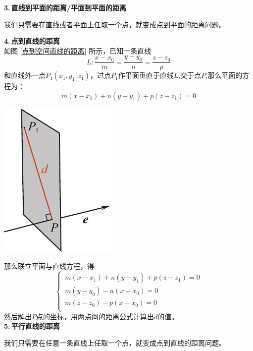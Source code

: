 \noindent \textbf{3.$\,$直线到平面的距离/平面到平面的距离}

我们只需要在直线或者平面上任取一个点，就变成点到平面的距离问题。
\vspace*{1em}

\noindent
\begin{minipage}{0.65\linewidth}
	\noindent \textbf{4.$\,$点到直线的距离}
 \\ \hspace*{2em}如图 \ref{点到空间直线的距离} 所示，已知一条直线
\begin{equation}
	L:\frac{x-x_0}{m}=\frac{y-y_0}{n}=\frac{z-z_0}{p}
\end{equation}
和直线外一点$P_1(x_1,y_1,z_1)$，过点$P_1$作平面垂直于直线$L$,交于点$P$,那么平面的方程为：
\begin{equation}
	m(x-x_1)+n(y-y_1)+p(z-z_1)=0
\end{equation}
\end{minipage}
\begin{minipage}{0.35\linewidth}
	\centering
	\includegraphics[width = 0.55\linewidth]{pic/C-5/linepd}
	\vspace*{-1em}
	\label{点到空间直线的距离}
\end{minipage}

\vspace*{0.5em}
\noindent 那么联立平面与直线方程，得
\begin{equation}
	\begin{cases}
		\, m(x-x_1)+n(y-y_1)+p(z-z_1)=0\\
		\, m(y-y_0)-n(x-x_0)=0\\
		\, m(z-z_0)-p(x-x_0)=0\\
	\end{cases}
\end{equation}
然后解出$P$点的坐标，用两点间的距离公式计算出$d$的值。\\[1em]
\textbf{5.$\,$平行直线的距离}
\par 我们只需要在任意一条直线上任取一个点，就变成点到直线的距离问题。



